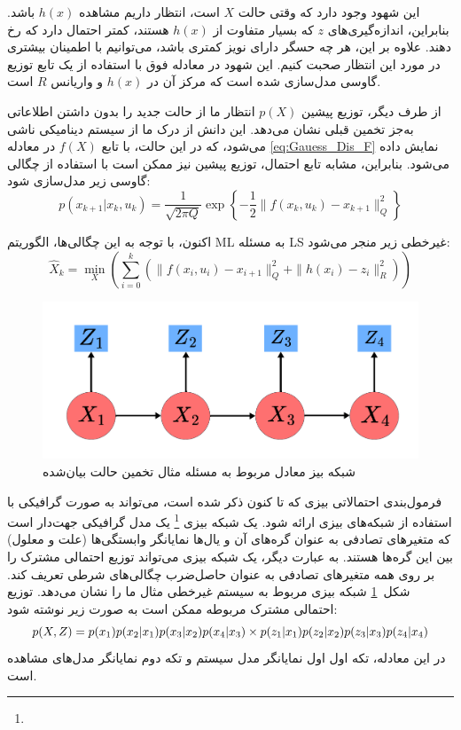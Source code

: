 این شهود وجود دارد که وقتی حالت \(X\) است، انتظار داریم مشاهده \(h(x)\) باشد. بنابراین،
اندازه‌گیری‌های \(z\) که بسیار متفاوت از \(h(x)\) هستند، کمتر احتمال دارد که رخ دهند. علاوه بر این،
هر چه حسگر دارای نویز کمتری باشد، می‌توانیم با اطمینان بیشتری در مورد این انتظار صحبت کنیم. این
شهود در معادله فوق با استفاده از یک تابع توزیع گاوسی مدل‌سازی شده است که
مرکز آن در \(h(x)\) و واریانس \(R\) است.

از طرف دیگر، توزیع پیشین \(p(X)\) انتظار ما از حالت جدید را بدون داشتن اطلاعاتی به‌جز تخمین قبلی نشان می‌دهد. این دانش از
درک ما از سیستم دینامیکی ناشی می‌شود، که در این حالت، با تابع \(f(X)\)
در معادله
\ref{eq:Gauess_Dis_F}
 نمایش داده می‌شود. بنابراین، مشابه تابع احتمال، توزیع پیشین نیز ممکن است
با استفاده از چگالی گاوسی زیر مدل‌سازی شود:
\begin{equation} \label{eq:Gauess_Dis_F}
	p(x_{k+1}|x_k, u_k) = \frac{1}{\sqrt{2\pi Q}} \exp \left\{ -\frac{1}{2} \| f(x_k, u_k) - x_{k+1} \|_Q^2 \right\}
\end{equation}

اکنون، با توجه به این چگالی‌ها، الگوریتم ML به مسئله LS غیرخطی زیر
منجر می‌شود:
\begin{equation}
	\hat{X}_k = \min_X \left( \sum_{i=0}^k \left(\| f(x_i, u_i) - x_{i+1} \|_Q^2 + \| h(x_i) - z_i \|_R^2 \right) \right)
\end{equation}

\begin{figure} [!t]
	\centering
	\includegraphics[width=0.5\linewidth]{img/BeyseNetAppendix}
	\caption{شبکه بیز معادل مربوط به مسئله مثال  تخمین حالت بیان‌شده}
	\label{fig:beysenetappendix}
\end{figure}

فرمول‌بندی احتمالاتی بیزی که تا کنون ذکر شده است، می‌تواند به صورت گرافیکی
با استفاده از شبکه‌های بیزی ارائه شود. یک شبکه بیزی
\footnote{}
یک مدل گرافیکی جهت‌دار است
که متغیرهای تصادفی به عنوان گره‌های آن و یال‌ها نمایانگر وابستگی‌ها (علت و معلول)
بین این گره‌ها هستند. به عبارت دیگر، یک شبکه بیزی می‌تواند توزیع احتمالی مشترک
را بر روی همه متغیرهای تصادفی به عنوان حاصل‌ضرب چگالی‌های شرطی تعریف کند. شکل~\ref{fig:beysenetappendix}
شبکه بیزی مربوط به سیستم غیرخطی مثال ما را نشان می‌دهد. توزیع احتمالی مشترک
مربوطه ممکن است به صورت زیر نوشته شود:
\begin{equation} \label{eq:JointProbability_Distribution}
	p(X, Z) = p(x_1) p(x_2|x_1) p(x_3|x_2) p(x_4|x_3) \newline
	\times p(z_1|x_1) p(z_2|x_2) p(z_3|x_3) p(z_4|x_4)
\end{equation}
در این معادله، تکه اول اول نمایانگر مدل سیستم و تکه دوم
نمایانگر مدل‌های مشاهده است.

